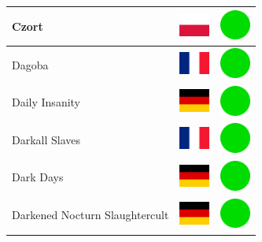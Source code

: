 \documentclass[12pt, a4paper, twoside]{report}
\begin{document}
\begin{center}
\begin{longtable}{|p{5cm}|p{2cm}|p{2cm}|}
 Czort                                                      & \includegraphics[width=1cm]{../img/flags/pl} &   \includegraphics[width=1cm]{../likes/y} \\ \hline
 Dagoba                                                     & \includegraphics[width=1cm]{../img/flags/fr} &   \includegraphics[width=1cm]{../likes/y} \\ \hline
 Daily Insanity                                             & \includegraphics[width=1cm]{../img/flags/de} &   \includegraphics[width=1cm]{../likes/y} \\ \hline
 Darkall Slaves                                             & \includegraphics[width=1cm]{../img/flags/fr} &   \includegraphics[width=1cm]{../likes/y} \\ \hline
 Dark Days                                                  & \includegraphics[width=1cm]{../img/flags/de} &   \includegraphics[width=1cm]{../likes/y} \\ \hline
 Darkened Nocturn Slaughtercult                             & \includegraphics[width=1cm]{../img/flags/de} &   \includegraphics[width=1cm]{../likes/y} \\ \hline

\end{longtable}
\end{center}
\end{document}
